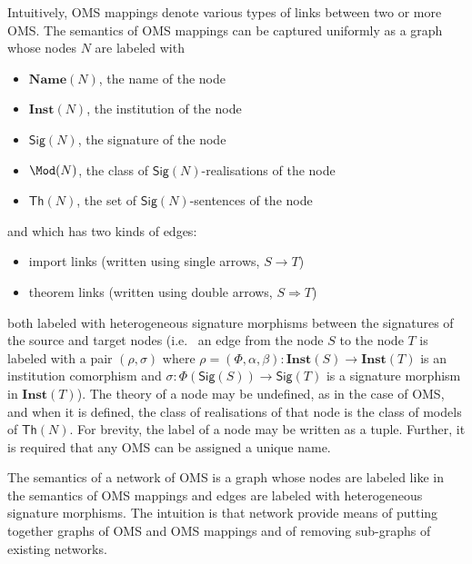 \documentclass[10pt, a4paper]{isov2}
\newcommand{\Sig}{\mathsf{Sig}}
\renewcommand{\Th}{\mathsf{Th}}
\newcommand{\Inst}{\ensuremath{\mathbf{Inst}}}
\newcommand{\Name}{\ensuremath{\mathbf{Name}}}
\begin{document}
Intuitively, OMS mappings denote various types of links between two or more OMS. 
The semantics of OMS mappings can be captured uniformly as a graph whose nodes $N$ are labeled with 
\begin{itemize}
 \item $\Name(N)$, the name of the node
 \item $\Inst(N)$, the institution of the node
 \item $\Sig(N)$, the signature of the node
 \item $\Mod(N)$, the class of $\Sig(N)$-realisations of the node
 \item $\Th(N)$, the set of $\Sig(N)$-sentences of the node
\end{itemize}
and 
which has two kinds of edges:
\begin{itemize}
  \item import links (written using single arrows, $S\rightarrow T$)
  \item theorem links (written using double arrows, $S\Rightarrow T$)
\end{itemize}
both labeled with 
heterogeneous signature morphisms between the signatures of the source and target nodes
(i.e.~ 
an edge from the node $S$ to the node $T$ is labeled with a pair 
$(\rho, \sigma)$ where $\rho=(\Phi,\alpha,\beta):\Inst(S)\to\Inst(T)$ is an institution comorphism and
$\sigma:\Phi(\Sig(S))\to\Sig(T)$ is a signature morphism in $\Inst(T)$).
The theory of a node  may be undefined, as in the case of OMS, and when it is defined, 
the class of realisations of that node is the class of models of $\Th(N)$. 
For brevity,  the label of a node may be written as a tuple. Further, it is required that  any OMS can be assigned a unique name. 

The semantics of a network of OMS is a graph
whose nodes are labeled like in the semantics of OMS mappings and 
edges are labeled with heterogeneous signature morphisms. 
The intuition is that
network provide means of putting together graphs of OMS and OMS mappings
and of removing sub-graphs of existing networks. 
\end{document}
